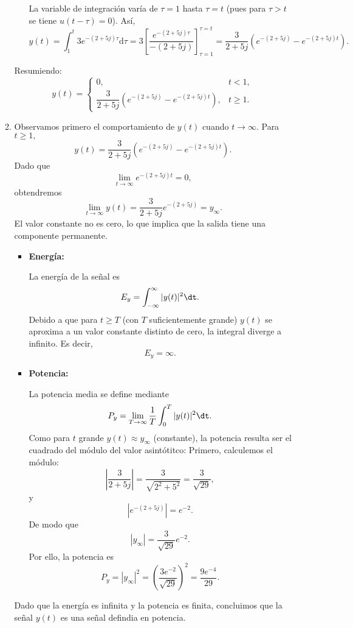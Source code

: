 \begin{enumerate}[label=\color{red}\textbf{\arabic*)}]
\begin{enumerate}[label=\color{red}\textbf{\alph*)}]
\begin{itemize}[label=\textbullet]
                La variable de integración varía de $\tau=1$ hasta  $\tau=t$ (pues para $\tau>t$ se tiene  $u(t-\tau)=0$). Así, \[
                y(t)=\int_{1}^{t} 3e^{-(2+5j)\tau}\mathrm{d}\tau=3\left[ \dfrac{e^{-(2+5j)\tau} }{-(2+5j)} \right]_{\tau=1}^{\tau=t} =\dfrac{3}{2+5j}\left( e^{-(2+5j)}-e^{-(2+5j)t}   \right)  . 
                \] 
        \end{itemize}
        Resumiendo: \[
            \boxed{y(t)=\begin{cases}
                    0, & t<1,\\
                    \dfrac{3}{2+5j}\left( e^{-(2+5j)}-e^{-(2+5j)t}   \right) , & t\ge 1.
            \end{cases}}
        \] 
    \item {} 

        Observamos primero el comportamiento de $y(t)$ cuando  $t\to \infty$. Para $t\ge 1,$ \[
        y(t)=\dfrac{3}{2+5j}\left( e^{-(2+5j)}-e^{-(2+5j)t}   \right) .
        \] 
        Dado que \[
        \lim_{t \to \infty} e^{-(2+5j)t}=0, 
        \] obtendremos \[
        \lim_{t \to \infty} y(t)=\dfrac{3}{2+5j}e^{-(2+5j)} =y_\infty.
        \] 
        El valor constante no es cero, lo que implica que la salida tiene una componente permanente.
        \begin{itemize}[label=\textbullet]
            \item \textbf{Energía:}

                La energía de la señal es \[
                E_y=\int_{-\infty}^{\infty} |y(t)|^2\dt. 
                \] 
                Debido a que para $t\ge T$ (con $T$ suficientemente grande) $y(t)$ se aproxima a un valor constante distinto de cero, la integral diverge a infinito. Es decir, \[
                E_y=\infty.
                \] 
            \item \textbf{Potencia:}

                La potencia media se define mediante \[
                P_y=\lim_{T \to \infty} \dfrac{1}{T}\int_{0}^{T} |y(t)|^2\dt. 
                \] 
                Como para $t$ grande  $y(t)\approx y_\infty$ (constante), la potencia resulta ser el cuadrado del módulo del valor asintótitco: Primero, calculemos el módulo:  \[
                \left| \dfrac{3}{2+5j} \right| =\dfrac{3}{\sqrt{2^2+5^2} }=\dfrac{3}{\sqrt{29} },
                \] y \[
                \left| e^{-(2+5j)}  \right| =e^{-2}. 
                \] 
                De modo que \[
                |y_\infty|=\dfrac{3}{\sqrt{29} }e^{-2}. 
                \] 
                Por ello, la potencia es \[
                P_y=|y_\infty|^2=\left( \dfrac{3e^{-2}}{\sqrt{29}}  \right)^2 =\dfrac{9e^{-4} }{29}.
                \] 
        \end{itemize}
        Dado que la energía es infinita y la potencia es finita, concluimos que la señal $y(t)$ es una señal defindia en potencia.
\end{enumerate}


\end{enumerate}

